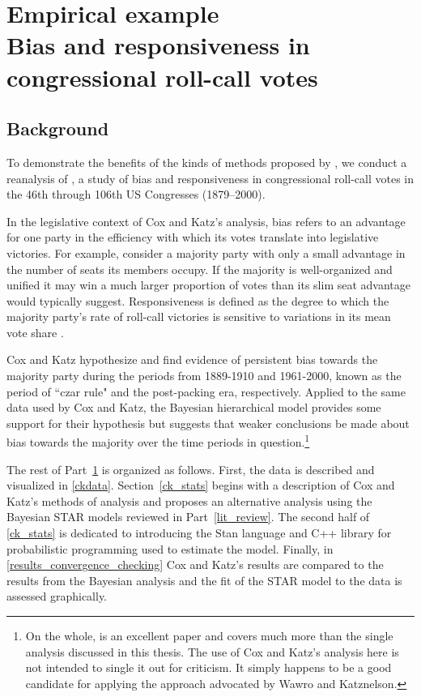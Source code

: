\chapter[Empirical example: Bias and Responsiveness in Congressional Roll-Call Votes]{Empirical example \\[-20pt]\large Bias and responsiveness in congressional roll-call votes}
\label{cox_katz}

\vspace{-1cm}
\section{Background}
\label{ck_background}

To demonstrate the benefits of the kinds of methods proposed by , 
we conduct a reanalysis of , a study of bias and responsiveness 
in congressional roll-call votes in the 46th through 106th US Congresses (1879--2000). 

In the legislative context of Cox and Katz's analysis, bias refers to an advantage for one party 
in the efficiency with which its votes translate into legislative victories. For example, consider 
a majority party with only a small advantage in the number of seats its members occupy. If the 
majority is well-organized and unified it may win a much larger proportion of votes than its slim 
seat advantage would typically suggest. Responsiveness is defined as the degree to which the 
majority party's rate of roll-call victories is sensitive to variations in its mean vote share 
. 

Cox and Katz hypothesize and find evidence of persistent bias towards the majority party during 
the periods from 1889-1910 and 1961-2000, known as the period of ``czar rule" and the post-packing 
era, respectively. Applied to the same data used by Cox and Katz, the Bayesian hierarchical 
model provides some support for their hypothesis but suggests that weaker conclusions 
be made about bias towards the majority over the time periods in question.\footnote{On the whole, 
 is an excellent paper and covers 
much more than the single analysis discussed in this thesis. The use of Cox and Katz's analysis here
is not intended to single it out for criticism. It simply happens to be a good candidate for applying the 
approach advocated by Wawro and Katznelson.} 

The rest of Part~\ref{cox_katz} is organized as follows. First, the data is described and visualized 
in \ref{ckdata}. Section~\ref{ck_stats} begins with a description of Cox and Katz's methods of analysis 
and proposes an alternative analysis using the Bayesian STAR models reviewed in Part~\ref{lit_review}. 
The second half of \ref{ck_stats} is dedicated to introducing the Stan language and C++ library for 
probabilistic programming used to estimate the model. Finally, in \ref{results_convergence_checking}  
Cox and Katz's results are compared to the results from the Bayesian analysis and the fit of the STAR model
to the data is assessed graphically.  




